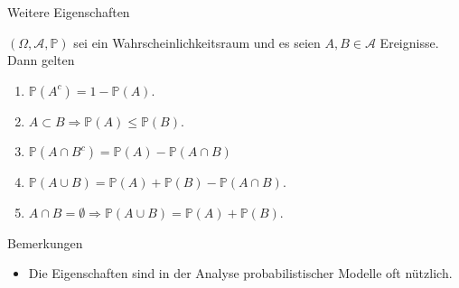 \documentclass[
  8pt,
  ignorenonframetext,
]{beamer}
\providecommand{\tightlist}{%
  \setlength{\itemsep}{0pt}\setlength{\parskip}{0pt}}
\begin{document}
\begin{frame}{Weitere Eigenschaften}
\protect\hypertarget{weitere-eigenschaften}{}
\begin{theorem}
\normalfont
\justifying
$(\Omega, \mathcal{A}, \mathbb{P})$ sei ein Wahrscheinlichkeitsraum und es seien
$A,B \in \mathcal{A}$ Ereignisse. Dann gelten
\begin{enumerate}
\itemsep2mm
\item $\mathbb{P}(A^c) = 1 - \mathbb{P}(A)$.
\item $A \subset B \Rightarrow \mathbb{P}(A) \le \mathbb{P}(B)$.
\item $\mathbb{P}(A \cap B^c) = \mathbb{P}(A) - \mathbb{P}(A \cap B)$
\item $\mathbb{P}(A \cup B) = \mathbb{P}(A) + \mathbb{P}(B) - \mathbb{P}(A \cap B)$.
\item $A \cap B = \emptyset \Rightarrow \mathbb{P}(A \cup B) = \mathbb{P}(A) + \mathbb{P}(B)$.
\end{enumerate}
\end{theorem}

\small

Bemerkungen

\begin{itemize}
\tightlist
\item
  Die Eigenschaften sind in der Analyse probabilistischer Modelle oft
  nützlich.
\end{itemize}
\end{frame}
\end{document}
